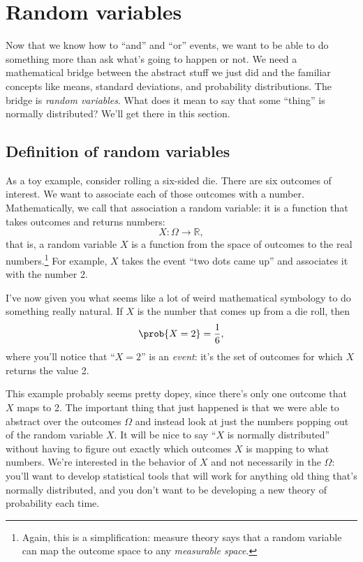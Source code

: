 
\chapter{Random variables}

Now that we know how to ``and'' and ``or'' events, we want to be able to do
something more than ask what's going to happen or not. We need a mathematical
bridge between the abstract stuff we just did and the familiar concepts like
means, standard deviations, and probability distributions. The bridge is
\emph{random variables}. What does it mean to say that some ``thing'' is
normally distributed? We'll get there in this section.

\section{Definition of random variables}

As a toy example, consider rolling a six-sided die. There are six outcomes of
interest. We want to associate each of those outcomes with a number.
Mathematically, we call that association a random variable: it is a function
that takes outcomes and returns numbers:
$$
X : \Omega \to \mathbb{R},
$$
that is, a random variable $X$ is a function from the space of outcomes to the
real numbers.\footnote{Again, this is a simplification: measure theory says
that a random variable can map the outcome space to any \emph{measurable
space}.} For example, $X$ takes the event ``two dots came up'' and associates
it with the number 2.

I've now given you what seems like a lot of weird mathematical symbology to do something really natural. If $X$ is the number that comes up from a die roll, then
$$
\prob{X = 2} = \frac{1}{6},
$$
where you'll notice that ``$X = 2$'' is an \emph{event}: it's the
set of outcomes for which $X$ returns the value 2.

This example probably seems pretty dopey, since there's only one outcome that
$X$ maps to 2. The important thing that just happened is that we were able to
abstract over the outcomes $\Omega$ and instead look at just the numbers
popping out of the random variable $X$. It will be nice to say ``$X$ is
normally distributed'' without having to figure out exactly which outcomes $X$
is mapping to what numbers. We're interested in the behavior of $X$ and not
necessarily in the $\Omega$: you'll want to develop statistical tools that
will work for anything old thing that's normally distributed, and you don't
want to be developing a new theory of probability each time.

